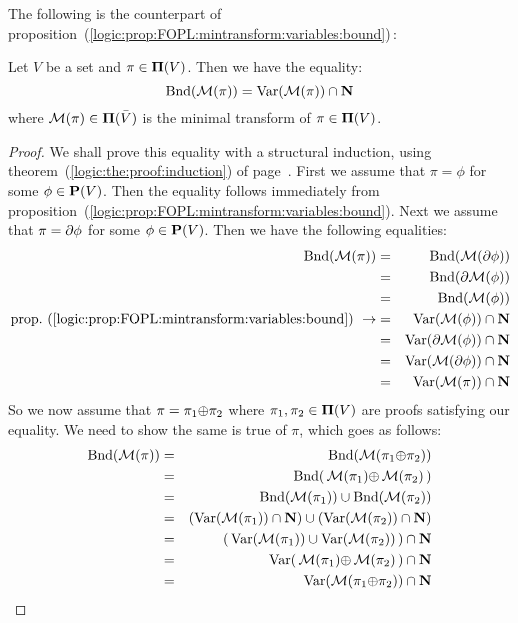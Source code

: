 The following is the counterpart of
proposition~(\ref{logic:prop:FOPL:mintransform:variables:bound})\,:
\begin{prop}\label{logic:prop:FUAP:mintransformproof:boundvar}
Let $V$ be a set and $\pi\in\mbox{${\bf\Pi}(V)$}$. Then we have the equality:
    \[
    \mbox{\rm Bnd}({\cal M}(\pi))=\mbox{\rm Var}({\cal M}(\pi))\cap\mbox{$\bf N$}
    \]
where ${\cal M}(\pi)\in{\bf\Pi}(\bar{V})$ is the minimal transform
of $\pi\in\mbox{${\bf\Pi}(V)$}$.
\end{prop}
\begin{proof}
We shall prove this equality with a structural induction, using
theorem~(\ref{logic:the:proof:induction}) of
page~\pageref{logic:the:proof:induction}. First we assume that
$\pi=\phi$ for some $\phi\in\mbox{${\bf P}(V)$}$. Then the equality follows
immediately from
proposition~(\ref{logic:prop:FOPL:mintransform:variables:bound}).
Next we assume that $\pi=\mbox{$\partial$}\phi$ for some $\phi\in\mbox{${\bf P}(V)$}$. Then we
have the following equalities:
    \begin{eqnarray*}
    \bound({\cal M}(\pi))&=&\bound({\cal M}(\axi\phi))\\
    &=&\bound(\axi{\cal M}(\phi))\\
    &=&\bound({\cal M}(\phi))\\
    \mbox{prop.~(\ref{logic:prop:FOPL:mintransform:variables:bound})}\ \rightarrow
    &=&\var({\cal M}(\phi))\cap\N\\
    &=&\var(\axi{\cal M}(\phi))\cap\N\\
    &=&\var({\cal M}(\axi\phi))\cap\N\\
    &=&\var({\cal M}(\pi))\cap\N\\
    \end{eqnarray*}
So we now assume that $\pi=\pi_{1}\mbox{$\oplus$}\pi_{2}$ where
$\pi_{1},\pi_{2}\in\mbox{${\bf\Pi}(V)$}$ are proofs satisfying our equality. We need
to show the same is true of $\pi$, which goes as follows:
    \begin{eqnarray*}
    \bound({\cal M}(\pi))&=&\bound({\cal M}(\pi_{1}\pon\pi_{2}))\\
    &=&\bound(\,{\cal M}(\pi_{1})\pon\,{\cal M}(\pi_{2})\,)\\
    &=&\bound({\cal M}(\pi_{1}))\cup\bound({\cal M}(\pi_{2}))\\
    &=&(\var({\cal M}(\pi_{1}))\cap\N)\cup(\var({\cal M}(\pi_{2}))\cap\N)\\
    &=&(\,\var({\cal M}(\pi_{1}))\cup\var({\cal M}(\pi_{2}))\,)\cap\N\\
    &=&\var(\,{\cal M}(\pi_{1})\pon\,{\cal M}(\pi_{2})\,)\cap\N\\
    &=&\var({\cal M}(\pi_{1}\pon\pi_{2}))\cap\N\\

\end{eqnarray*}
\end{proof}
